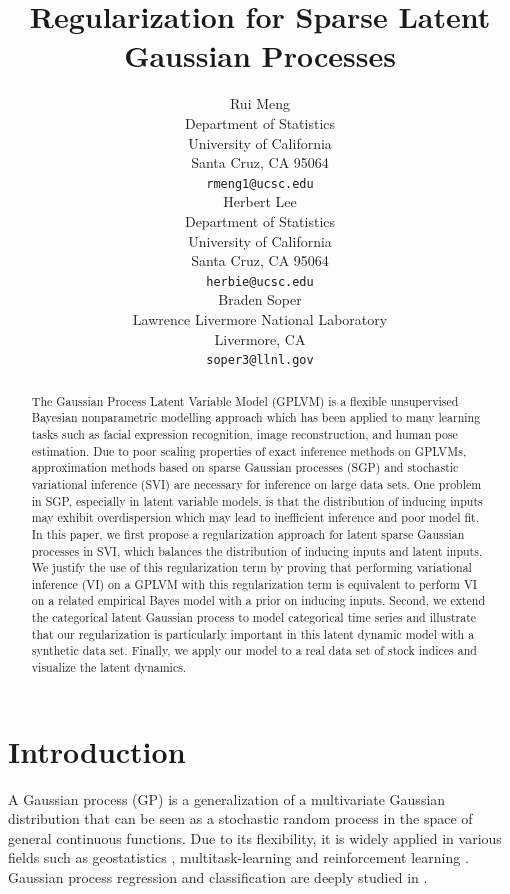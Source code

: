 \documentclass{article}
\title{Regularization for Sparse Latent Gaussian Processes}
\author{%
	Rui Meng%
        \\
	Department of Statistics\\
	University of California\\
	Santa Cruz, CA 95064 \\
	\texttt{rmeng1@ucsc.edu} \\
	\And
	Herbert Lee \\
	Department of Statistics\\
	University of California\\
	Santa Cruz, CA 95064 \\
	\texttt{herbie@ucsc.edu} \\
    \And
	Braden Soper \\
	Lawrence Livermore National Laboratory \\
	Livermore, CA \\
	\texttt{soper3@llnl.gov} \\
}
\begin{document}
	
	\maketitle
	
\begin{abstract}
The Gaussian Process Latent Variable Model (GPLVM) is a flexible unsupervised Bayesian nonparametric modelling approach which has been applied to many learning tasks such as facial expression recognition, image reconstruction, and human pose estimation. Due to poor scaling properties of exact inference methods on GPLVMs, approximation methods based on sparse Gaussian processes (SGP) and stochastic variational inference (SVI) are necessary for inference on large data sets. One problem in SGP, especially in latent variable models, is that the distribution of inducing inputs may exhibit overdispersion which may lead to inefficient inference and poor model fit. In this paper, we first propose a regularization approach for latent sparse Gaussian processes in SVI, which balances the distribution of inducing inputs and latent inputs. We justify the use of this regularization term by proving that performing variational inference (VI) on a GPLVM with this regularization term is equivalent to perform VI on a related empirical Bayes model with a prior on inducing inputs. Second, we extend the categorical latent Gaussian process to model categorical time series and illustrate that our regularization is particularly important in this latent dynamic model with a synthetic data set. Finally, we apply our model to a real data set of stock indices and visualize the latent dynamics.
\end{abstract}

\section{Introduction}
A Gaussian process (GP) is a generalization of a multivariate Gaussian distribution that can be seen as a stochastic random process in the space of general continuous functions. Due to its flexibility, it is widely applied in various fields such as geostatistics \citep{Cressie_1993}, multitask-learning \citep{Banerjee_2008} and reinforcement learning \citep{Rasmussen_2004}. Gaussian process regression and classification are deeply studied in \cite{Rasmussen_2005}.
\end{document}
